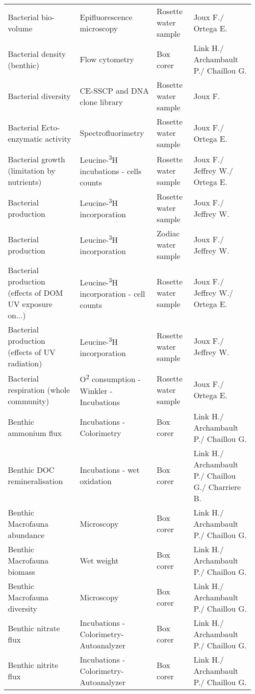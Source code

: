 \begin{longtable}[t]{llll}
\addlinespace
Bacterial bio-volume & Epifluorescence microscopy & Rosette water sample & Joux F./ Ortega E.\\
Bacterial density (benthic) & Flow cytometry & Box corer & Link H./ Archambault P./ Chaillou G.\\
Bacterial diversity & CE-SSCP and DNA clone library & Rosette water sample & Joux F.\\
Bacterial Ecto-enzymatic activity & Spectrofluorimetry & Rosette water sample & Joux F./ Ortega E.\\
Bacterial growth (limitation by nutrients) & Leucine-\textsuperscript{3}H incubations - cells counts & Rosette water sample & Joux F./ Jeffrey W./ Ortega E.\\
\addlinespace
Bacterial production & Leucine-\textsuperscript{3}H incorporation & Rosette water sample & Joux F./ Jeffrey W.\\
Bacterial production & Leucine-\textsuperscript{3}H incorporation & Zodiac water sample & Joux F./ Jeffrey W.\\
Bacterial production (effects of DOM UV exposure on...) & Leucine-\textsuperscript{3}H incorporation - cell counts & Rosette water sample & Joux F./ Jeffrey W./ Ortega E.\\
Bacterial production (effects of UV radiation) & Leucine-\textsuperscript{3}H incorporation & Rosette water sample & Joux F./ Jeffrey W.\\
Bacterial respiration (whole community) & O\textsuperscript{2} consumption - Winkler - Incubations & Rosette water sample & Joux F./ Ortega E.\\
\addlinespace
Benthic ammonium flux & Incubations - Colorimetry & Box corer & Link H./ Archambault P./ Chaillou G.\\
Benthic DOC remineralisation & Incubations - wet oxidation & Box corer & Link H./ Archambault P./ Chaillou G./ Charriere B.\\
Benthic Macrofauna abundance & Microscopy & Box corer & Link H./ Archambault P./ Chaillou G.\\
Benthic Macrofauna biomass & Wet weight & Box corer & Link H./ Archambault P./ Chaillou G.\\
Benthic Macrofauna diversity & Microscopy & Box corer & Link H./ Archambault P./ Chaillou G.\\
\addlinespace
Benthic nitrate flux & Incubations - Colorimetry- Autoanalyzer & Box corer & Link H./ Archambault P./ Chaillou G.\\
Benthic nitrite flux & Incubations - Colorimetry- Autoanalyzer & Box corer & Link H./ Archambault P./ Chaillou G.\\

\end{longtable}
